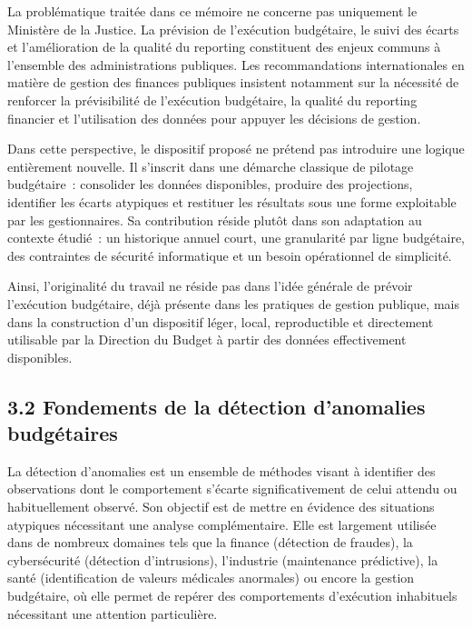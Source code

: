 La probl\'ematique trait\'ee dans ce m\'emoire ne concerne pas uniquement
le Minist\`ere de la Justice. La pr\'evision de l'ex\'ecution
budg\'etaire, le suivi des \'ecarts et l'am\'elioration de la qualit\'e
du reporting constituent des enjeux communs \`a l'ensemble des
administrations publiques. Les recommandations internationales en
mati\`ere de gestion des finances publiques insistent notamment sur la
n\'ecessit\'e de renforcer la pr\'evisibilit\'e de l'ex\'ecution
budg\'etaire, la qualit\'e du reporting financier et l'utilisation des
donn\'ees pour appuyer les d\'ecisions de gestion.

Dans cette perspective, le dispositif propos\'e ne pr\'etend pas
introduire une logique enti\`erement nouvelle. Il s'inscrit dans une
d\'emarche classique de pilotage budg\'etaire~: consolider les donn\'ees
disponibles, produire des projections, identifier les \'ecarts atypiques
et restituer les r\'esultats sous une forme exploitable par les
gestionnaires. Sa contribution r\'eside plut\^ot dans son adaptation au
contexte \'etudi\'e~: un historique annuel court, une granularit\'e par
ligne budg\'etaire, des contraintes de s\'ecurit\'e informatique et un
besoin op\'erationnel de simplicit\'e.

Ainsi, l'originalit\'e du travail ne r\'eside pas dans l'id\'ee
g\'en\'erale de pr\'evoir l'ex\'ecution budg\'etaire, d\'ej\`a pr\'esente
dans les pratiques de gestion publique, mais dans la construction d'un
dispositif l\'eger, local, reproductible et directement utilisable par
la Direction du Budget \`a partir des donn\'ees effectivement
disponibles.

\subsection*{3.2 \quad Fondements de la d\'etection d'anomalies budg\'etaires}

La d\'etection d'anomalies est un ensemble de m\'ethodes visant \`a identifier
des observations dont le comportement s'\'ecarte significativement de celui
attendu ou habituellement observ\'e. Son objectif est de mettre en \'evidence
des situations atypiques n\'ecessitant une analyse compl\'ementaire. Elle est
largement utilis\'ee dans de nombreux domaines tels que la finance
(d\'etection de fraudes), la cybers\'ecurit\'e (d\'etection d'intrusions),
l'industrie (maintenance pr\'edictive), la sant\'e (identification de valeurs
m\'edicales anormales) ou encore la gestion budg\'etaire, o\`u elle permet
de rep\'erer des comportements d'ex\'ecution inhabituels n\'ecessitant une
attention particuli\`ere.

